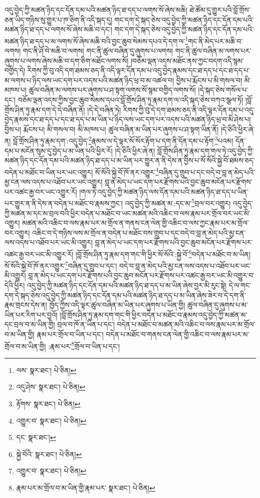 འདུ་བྱེད་ཀྱི་མཚན་ཉིད་དང་དོན་དམ་པའི་མཚན་ཉིད་ཐ་དད་པ་ལགས་སོ་ཞེས་མཆི། ཐེ་ཚོམ་དུ་གྱུར་པའི་བློ་གྲོས་ཅན་ཡིད་གཉིས་སུ་གྱུར་པ་ཁ་ཅིག་ནི་འདི་སྐད་དུ། གང་དག་དེ་སྐད་ཅེས་འདུ་བྱེད་ཀྱི་མཚན་ཉིད་དང་དོན་དམ་པའི་མཚན་ཉིད་ཐ་དད་པ་ལགས་སོ་ཞེས་མཆི་བ་དང་། གང་དག་དེ་སྐད་ཅེས་འདུ་བྱེད་ཀྱི་མཚན་ཉིད་དང་དོན་དམ་པའི་མཚན་ཉིད་ཐ་དད་པ་མ་ལགས་སོ་ཞེས་མཆི་བའི་བྱང་ཆུབ་སེམས་དཔའ་དེ་དག་ལ་\footnote{ལས་  སྣར་ཐང་།  པེ་ཅིན། }གང་ནི་མེད་པར་མཆི་བ་ལགས། གང་ནི་ཤོ་བེ་མཆི་བ་ལགས། གང་ནི་ཚུལ་བཞིན་དུ་ཞུགས་པ་ལགས། གང་ནི་ཚུལ་བཞིན་མ་ལགས་པར་ཞུགས་པ་ལགས་ཞེས་མཆི་བ་དག་ཅིག་མཐོང་ལགས་སོ། །བཅོམ་ལྡན་འདས་མཐོང་ནས་ཀྱང་བདག་འདི་སྙམ་བགྱིད་དེ། རིགས་ཀྱི་བུ་འདི་དག་ཐམས་ཅད་ནི་འདི་ལྟར་དོན་དམ་པ་འདུ་བྱེད་རྣམས་དང་ཐ་དད་པ་དང་ཐ་དད་པ་མ་ལགས་པ་ཉིད་ལས་ཡང་དག་པར་འདས་པའི་མཚན་ཉིད་ཕྲ་བ་མ་འཚལ་བ། བྱིས་པ་རྨོངས་པ་མི་གསལ་བ། མི་མཁས་པ། ཚུལ་བཞིན་མ་ལགས་པར་ཞུགས་པ་ཤ་སྟག་ལགས་སོ་སྙམ་བགྱིད་ལགས་སོ། །དེ་སྐད་ཅེས་གསོལ་པ་དང་། བཅོམ་ལྡན་འདས་ཀྱིས་བྱང་ཆུབ་སེམས་དཔའ་བློ་གྲོས་ཤིན་ཏུ་རྣམ་དག་ལ་འདི་སྐད་ཅེས་བཀའ་སྩལ་ཏོ། །བློ་གྲོས་ཤིན་ཏུ་རྣམ་དག་དེ་དེ་བཞིན་ནོ། །དེ་དེ་བཞིན་ཏེ། རིགས་ཀྱི་བུ་དེ་དག་ཐམས་ཅད་ནི་འདི་ལྟར་དོན་དམ་པ་འདུ་བྱེད་རྣམས་དང་ཐ་དད་པ་དང་ཐ་དད་པ་མ་ཡིན་པ་ཉིད་ལས་ཡང་དག་པར་འདས་པའི་མཚན་ཉིད་ཕྲ་བ་མི་ཤེས་པ། བྱིས་པ། རྨོངས་པ། མི་གསལ་བ། མི་མཁས་པ། ཚུལ་བཞིན་མ་ཡིན་པར་ཞུགས་པ་ཤ་སྟག་ཡིན་ནོ། །དེ་ཅིའི་ཕྱིར་ཞེ་ན། བློ་གྲོས་ཤིན་ཏུ་རྣམ་དག་:འདུ་བྱེད་\footnote{འདུ་ཤེས་  སྣར་ཐང་།  པེ་ཅིན། }རྣམས་ལ་དེ་ལྟར་སོ་སོར་རྟོག་པ་དག་ནི་དོན་དམ་པ་རྟོག་\footnote{རྟོགས་  སྣར་ཐང་།  པེ་ཅིན། }པའམ། དོན་དམ་པ་མངོན་སུམ་དུ་བྱེད་པ་མ་ཡིན་པའི་ཕྱིར་རོ། །དེ་ཅིའི་ཕྱིར་ཞེ་ན། བློ་གྲོས་ཤིན་ཏུ་རྣམ་དག་གལ་ཏེ་འདུ་བྱེད་ཀྱི་མཚན་ཉིད་དང་དོན་དམ་པའི་མཚན་ཉིད་ཐ་དད་པ་མ་ཡིན་པར་གྱུར་ན་ནི་དེས་ན་བྱིས་པ་སོ་སོའི་སྐྱེ་བོ་ཐམས་ཅད་བདེན་པ་མཐོང་བ་ཡིན་པར་ཡང་འགྱུར། སོ་སོའི་སྐྱེ་བོ་ཁོ་ནར་འགྱུར་\footnote{འགྱུར་བ་  སྣར་ཐང་།  པེ་ཅིན། }བཞིན་དུ་གྲུབ་པ་དང་བདེ་བ་བླ་ན་མེད་པའི་མྱ་ངན་ལས་འདས་པ་འཐོབ་པར་ཡང་འགྱུར། བླ་ན་མེད་པ་ཡང་དག་པར་རྫོགས་པའི་བྱང་ཆུབ་མངོན་པར་རྫོགས་པར་འཚང་རྒྱ་བར་ཡང་འགྱུར་རོ། །གལ་ཏེ་འདུ་བྱེད་ཀྱི་མཚན་ཉིད་ལས་དོན་དམ་པའི་མཚན་ཉིད་ཐ་དད་པ་ཡིན་པར་གྱུར་ན་ནི་དེས་ན་བདེན་པ་མཐོང་བ་རྣམས་ཀྱང་། འདུ་བྱེད་ཀྱི་མཚན་མ་:དང་མ་\footnote{དང་  སྣར་ཐང་། }བྲལ་བར་འགྱུར། འདུ་བྱེད་ཀྱི་མཚན་མ་དང་མ་བྲལ་བའི་ཕྱིར་བདེན་པ་མཐོང་བ་ཡང་མཚན་མའི་འཆིང་བ་ལས་རྣམ་པར་གྲོལ་བར་ཡང་མི་འགྱུར། མཚན་མའི་འཆིང་བ་ལས་རྣམ་པར་མ་གྲོལ་ན་གནས་ངན་ལེན་གྱི་འཆིང་བ་ལས་ཀྱང་རྣམ་པར་མ་གྲོལ་བར་འགྱུར། འཆིང་བ་དེ་གཉིས་ལས་མ་གྲོལ་ན་བདེན་པ་མཐོང་བས་གྲུབ་པ་དང་བདེ་བ་བླ་ན་མེད་པའི་མྱ་ངན་ལས་འདས་པ་འཐོབ་པར་ཡང་མི་འགྱུར། བླ་ན་མེད་པ་ཡང་དག་པར་རྫོགས་པའི་བྱང་ཆུབ་མངོན་པར་རྫོགས་པར་འཚང་རྒྱ་བར་ཡང་མི་འགྱུར་རོ། །བློ་གྲོས་ཤིན་ཏུ་རྣམ་དག་གང་གི་ཕྱིར་སོ་སོའི་:སྐྱེ་བོ་\footnote{སྐྱེ་བོའི་  སྣར་ཐང་།  པེ་ཅིན། }བདེན་པ་མཐོང་བ་མ་ཡིན། སོ་སོའི་སྐྱེ་བོ་ཁོ་ནར་འགྱུར་\footnote{འགྱུར་བ་  སྣར་ཐང་།  པེ་ཅིན། }བཞིན་དུ་གྲུབ་པ་དང་། བདེ་བ་བླ་ན་མེད་པའི་མྱ་ངན་ལས་འདས་པ་འཐོབ་པར་ཡང་མི་འགྱུར། བླ་ན་མེད་པ་ཡང་དག་པར་རྫོགས་པའི་བྱང་ཆུབ་མངོན་པར་རྫོགས་པར་འཚང་རྒྱ་བར་ཡང་མི་འགྱུར་བ་དེའི་ཕྱིར། འདུ་བྱེད་ཀྱི་མཚན་ཉིད་དང་དོན་དམ་པའི་མཚན་ཉིད་ཐ་དད་པ་མ་ཡིན་ཞེས་བྱར་མི་རུང་སྟེ། དེ་ལ་གང་དག་དེ་སྐད་ཅེས་འདུ་བྱེད་ཀྱི་མཚན་ཉིད་དང་དོན་དམ་པའི་མཚན་ཉིད་ཐ་དད་པ་མ་ཡིན་ཞེས་ཟེར་བ་དེ་དག་ནི་རྣམ་གྲངས་དེས་ན། ཁྱོད་ཀྱིས་འདི་ལྟར་ཚུལ་བཞིན་མ་ཡིན་པར་ཞུགས་པ་ཡིན་གྱི། ཚུལ་བཞིན་དུ་ཞུགས་པ་མ་ཡིན་པར་རིག་པར་བྱའོ། །བློ་གྲོས་ཤིན་ཏུ་རྣམ་དག་གང་གི་ཕྱིར་བདེན་པ་མཐོང་བ་རྣམས་འདུ་བྱེད་ཀྱི་མཚན་མ་དང་བྲལ་བ་མ་ཡིན་གྱི། བྲལ་བ་ཁོ་ན་ཡིན་པ་དང་། བདེན་པ་མཐོང་བ་མཚན་མའི་འཆིང་བ་ལས་རྣམ་པར་མ་གྲོལ་བ་མ་ཡིན་གྱི། རྣམ་པར་གྲོལ་བ་ཡིན་པ་དང་། བདེན་པ་མཐོང་བ་གནས་ངན་ལེན་གྱི་འཆིང་བ་ལས་རྣམ་པར་མ་གྲོལ་བ་མ་ཡིན་གྱི། :རྣམ་པར་\footnote{རྣམ་པར་མ་གྲོལ་བ་མ་ཡིན་གྱི་རྣམ་པར་  སྣར་ཐང་།  པེ་ཅིན། }གྲོལ་བ་ཡིན་པ་དང་། 